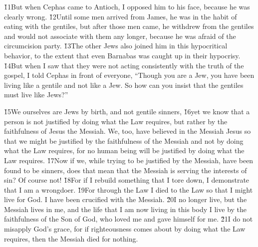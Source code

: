\v{11}But when Cephas came to Antioch, I opposed him to his face, because he was clearly wrong. \v{12}Until some men arrived from James, he was in the habit of eating with the gentiles, but after those men came, he withdrew from the gentiles and would not associate with them any longer, because he was afraid of the circumcision party. \v{13}The other Jews also joined him in this hypocritical behavior, to the extent that even Barnabas was caught up in their hypocrisy. \v{14}But when I saw that they were not acting consistently with the truth of the gospel, I told Cephas in front of everyone, ``Though you are a Jew, you have been living like a gentile and not like a Jew. So how can you insist that the gentiles must live like Jews?''

\v{15}We ourselves are Jews by birth, and not gentile sinners, \v{16}yet we know that a person is not justified by doing what the Law requires, but rather by the faithfulness of Jesus the Messiah. We, too, have believed in the Messiah Jesus so that we might be justified by the faithfulness of the Messiah and not by doing what the Law requires, for no human being will be justified by doing what the Law requires. \v{17}Now if we, while trying to be justified by the Messiah, have been found to be sinners, does that mean that the Messiah is serving the interests of sin? Of course not! \v{18}For if I rebuild something that I tore down, I demonstrate that I am a wrongdoer. \v{19}For through the Law I died to the Law so that I might live for God. I have been crucified with the Messiah. \v{20}I no longer live, but the Messiah lives in me, and the life that I am now living in this body I live by the faithfulness of the Son of God, who loved me and gave himself for me. \v{21}I do not misapply God's grace, for if righteousness comes about by doing what the Law requires, then the Messiah died for nothing.

